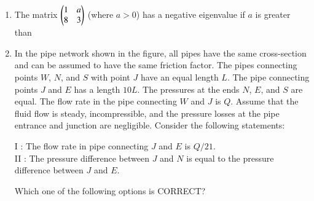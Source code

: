 \documentclass[journal]{IEEEtran}
\begin{document}
\begin{enumerate}[leftmargin=0pt]
\vspace{2mm}

\begin{enumerate}
\end{enumerate}

\hfill{}

\vspace{4mm}

\item
The matrix $\begin{pmatrix}1 & a \\ 8 & 3\end{pmatrix}$ (where $a > 0$) has a negative eigenvalue if $a$ is greater than

\vspace{2mm}

\begin{enumerate}
\end{enumerate}

\hfill{}



\item
In the pipe network shown in the figure, all pipes have the same cross-section and can be assumed to have the same friction factor. The pipes connecting points $W$, $N$, and $S$ with point $J$ have an equal length $L$. The pipe connecting points $J$ and $E$ has a length $10L$. The pressures at the ends $N$, $E$, and $S$ are equal. The flow rate in the pipe connecting $W$ and $J$ is $Q$. Assume that the fluid flow is steady, incompressible, and the pressure losses at the pipe entrance and junction are negligible. Consider the following statements:

I : The flow rate in pipe connecting $J$ and $E$ is $Q/21$.\\
II : The pressure difference between $J$ and $N$ is equal to the pressure difference between $J$ and $E$.

Which one of the following options is CORRECT?


\end{enumerate}
\end{document}
